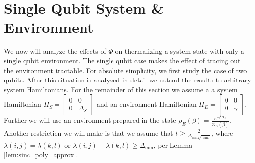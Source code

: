 \documentclass{article}
\newcommand{\partfun}{\mathcal{Z}}
\DeclareMathOperator{\sinc}{sinc}
\begin{document}
\section{Single Qubit System \& Environment}
We now will analyze the effects of $\Phi$ on thermalizing a system state with only a single qubit environment. The single qubit case makes the effect of tracing out the environment tractable. For absolute simplicity, we first study the case of two qubits. After this situation is analyzed in detail we extend the results to arbitrary system Hamiltonians. For the remainder of this section we assume a a system Hamiltonian $H_S = \begin{bmatrix}
    0 & 0 \\ 0 & \Delta_S
\end{bmatrix}$ and an environment Hamiltonian $H_E = \begin{bmatrix}
    0 & 0 \\ 0 & \gamma
\end{bmatrix}$. Further we will use an environment prepared in the state $\rho_E(\beta) = \frac{e^{-\beta H_E}}{\partfun_E(\beta)}$. Another restriction we will make is that we assume that $t \geq \frac{2}{\Delta_{\min} \sqrt{\epsilon_{\sinc}}}$, where $\lambda(i,j) = \lambda(k,l)$ or $\lambda(i,j) - \lambda(k,l) \geq \Delta_{\min}$, per Lemma \ref{lem:sinc_poly_approx}. 
\end{document}

